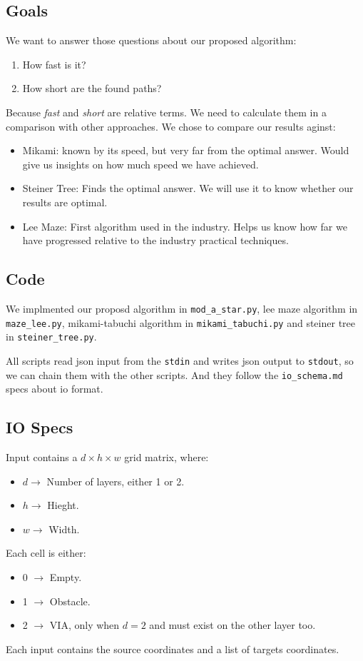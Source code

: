 \subsection{Goals}
We want to answer those questions about our proposed algorithm:
\begin{enumerate}
    \item How fast is it?
    \item How short are the found paths?
\end{enumerate}
Because \textit{fast} and \textit{short} are relative terms. We need to calculate them in a comparison with other approaches. 
We chose to compare our results aginst:
\begin{itemize}
    \item Mikami: known by its speed, but very far from the optimal answer. Would give us insights on how much speed we have achieved.
    \item Steiner Tree: Finds the optimal answer. We will use it to know whether our results are optimal.
    \item Lee Maze: First algorithm used in the industry. Helps us know how far we have progressed relative to the industry practical techniques.
\end{itemize}

\subsection{Code}
We implmented our proposd algorithm in \texttt{mod\_a\_star.py}, 
lee maze algorithm in \texttt{maze\_lee.py},
mikami-tabuchi algorithm in \texttt{mikami\_tabuchi.py}
and steiner tree in \texttt{steiner\_tree.py}.

All scripts read json input from the \texttt{stdin} and writes json output to \texttt{stdout}, so we can chain them with the other scripts. And they follow the \texttt{io\_schema.md} specs about io format.

\subsection{IO Specs}
Input contains a $d\times h \times w$ grid matrix, where:
\begin{itemize}
    \item $d \rightarrow$ Number of layers, either 1 or 2.
    \item $h \rightarrow$ Hieght.
    \item $w \rightarrow$ Width.
\end{itemize}
Each cell is either:
\begin{itemize}
    \item 0 $\rightarrow$ Empty.
    \item 1 $\rightarrow$ Obstacle.
    \item 2 $\rightarrow$ VIA, only when $d=2$ and must exist on the other layer too.
\end{itemize}
Each input contains the source coordinates and a list of targets coordinates.

